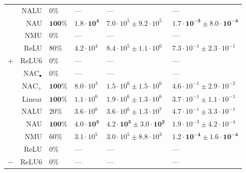 \begin{table}[H]
\begin{tabular}{crllll}
 & NALU & $0\%$ & --- & --- & ---\\

 & NAU & $\mathbf{100\%}$ & $\mathbf{1.8 \cdot 10^{4}}$ & $7.0 \cdot 10^{5} \pm 9.2 \cdot 10^{5}$ & $\mathbf{1.7 \cdot 10^{-3} \pm 8.0 \cdot 10^{-4}}$\\

 & NMU & $0\%$ & --- & --- & ---\\

 & ReLU & $80\%$ & $4.2 \cdot 10^{4}$ & $8.4 \cdot 10^{5} \pm 1.1 \cdot 10^{6}$ & $7.3 \cdot 10^{-1} \pm 2.3 \cdot 10^{-1}$\\

\multirow{-8}{*}{\centering\arraybackslash $\bm{+}$} & ReLU6 & $0\%$ & --- & --- & ---\\
\cmidrule{1-6}
 & $\mathrm{NAC}_{\bullet}$ & $0\%$ & --- & --- & ---\\

 & $\mathrm{NAC}_{+}$ & $\mathbf{100\%}$ & $8.0 \cdot 10^{3}$ & $1.5 \cdot 10^{6} \pm 1.5 \cdot 10^{6}$ & $4.6 \cdot 10^{-1} \pm 2.9 \cdot 10^{-2}$\\

 & Linear & $\mathbf{100\%}$ & $1.1 \cdot 10^{6}$ & $1.9 \cdot 10^{6} \pm 1.3 \cdot 10^{6}$ & $3.7 \cdot 10^{-1} \pm 1.1 \cdot 10^{-1}$\\

 & NALU & $20\%$ & $3.6 \cdot 10^{6}$ & $3.6 \cdot 10^{6} \pm 1.3 \cdot 10^{7}$ & $4.7 \cdot 10^{-1} \pm 3.3 \cdot 10^{-1}$\\

 & NAU & $\mathbf{100\%}$ & $\mathbf{4.0 \cdot 10^{3}}$ & $\mathbf{4.2 \cdot 10^{3} \pm 3.0 \cdot 10^{2}}$ & $1.9 \cdot 10^{-3} \pm 4.2 \cdot 10^{-4}$\\

 & NMU & $60\%$ & $3.1 \cdot 10^{5}$ & $3.0 \cdot 10^{5} \pm 8.8 \cdot 10^{3}$ & $\mathbf{1.2 \cdot 10^{-4} \pm 1.6 \cdot 10^{-4}}$\\

 & ReLU & $0\%$ & --- & --- & ---\\

\multirow{-8}{*}{\centering\arraybackslash $\bm{-}$} & ReLU6 & $0\%$ & --- & --- & ---\\
\bottomrule
\end{tabular}
\end{table}
